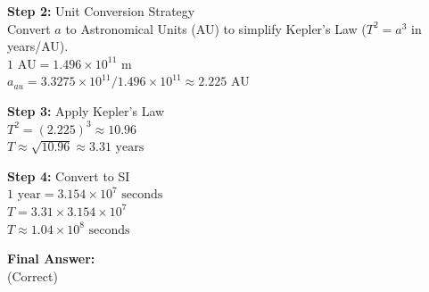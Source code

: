 \begin{minipage}{\linewidth}
\begin{tcolorbox}[
    title={\textbf{IPhO 2013 Q1}},
    colback=white,
    colframe=gray!50!black,
    arc=3pt,
    boxrule=1pt,
    fonttitle=\sffamily\large,
    width=\linewidth
]
\begin{minipage}[t]{0.49\linewidth}
\begin{tcolorbox}
            \textbf{\textcolor{green!40!black}{Step 2:}} Unit Conversion Strategy\\
            Convert $a$ to Astronomical Units (AU) to simplify Kepler's Law ($T^2 = a^3$ in years/AU).\\
            $1\text{ AU} = 1.496 \times 10^{11}\text{ m}$\\
            $a_{au} = 3.3275 \times 10^{11} / 1.496 \times 10^{11} \approx 2.225\text{ AU}$
            \vspace{1em}
            
            \textbf{\textcolor{green!40!black}{Step 3:}} Apply Kepler's Law\\
            $T^2 = (2.225)^3 \approx 10.96$\\
            $T \approx \sqrt{10.96} \approx 3.31\text{ years}$
            \vspace{1em}
            
            \textbf{\textcolor{green!40!black}{Step 4:}} Convert to SI\\
            $1\text{ year} = 3.154 \times 10^7\text{ seconds}$\\
            $T = 3.31 \times 3.154 \times 10^7$\\
            $T \approx 1.04 \times 10^8\text{ seconds}$
            \vspace{1em}
            
            \textbf{Final Answer:}\\\vspace{1em}
             (Correct)
        \end{tcolorbox}
    \end{minipage}

\end{tcolorbox}
    \label{fig:ipho_2013_q1}
\end{minipage}